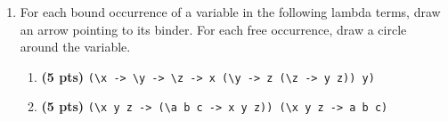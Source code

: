 \documentclass[paper=letter, fontsize=13pt]{article} %
\numberwithin{equation}{section} %
\newif\ifshowanswers\showanswerstrue
\begin{document}
\begin{enumerate}
\begin{verbatim}
let POW = ______(D)_______
\end{verbatim}
\begin{enumerate}[label=(\Alph*)]
   \item 
     \ifshowanswers 
      (5pts) \verb|(ISZ n)|  (parens optional).  Minor deduction (.5) for more complicated but correct answer.  Full credit if it is just the negation (i.e., using NOT)
     \else
           \bigskip
           \bigskip
           \bigskip
           \bigskip
     \fi
   \item
     \ifshowanswers 
       (5pts) \verb|ONE|  or \verb|n| 
     \else
           \bigskip
           \bigskip
           \bigskip
           \bigskip
     \fi
   \item
     \ifshowanswers 
      (5pts) \verb|MULT n (f (DECR x))|.  Full credit  requires correct operation (MULT), correct use of recursive call (f), and correct argument to f (DECR x), roughly equal weight.  Minor deduction (.5) for more complicated answer or other small errors.
     \else
           \bigskip
           \bigskip
           \bigskip
           \bigskip
     \fi
   \item 
     \ifshowanswers 
     (5pts) \verb|FIX POW1| . Half credit at least if FIX is applied to PROD1 in some way.
     \else
           \bigskip
           \bigskip
           \bigskip
           \bigskip
     \fi
\end{enumerate}

\newpage

\item For each bound occurrence of a variable in the following lambda terms, 
draw an arrow pointing to its binder. For each free occurrence, draw a circle around the variable.

\bigskip
\bigskip
\bigskip

\begin{enumerate}[label=(\Alph*)]
\item \textbf{(5 pts)} {\Large
  \verb|(\x -> \y -> \z -> x (\y -> z (\z -> y z)) y)|
}
\bigskip
\bigskip
\bigskip
\bigskip
\bigskip
\bigskip
\bigskip
\bigskip
\bigskip
\bigskip
\bigskip
\bigskip
\bigskip
\bigskip

\item \textbf{(5 pts)} {\Large
  \verb|(\x y z -> (\a b c -> x y z)) (\x y z -> a b c)|
}
\end{enumerate}

\bigskip
\bigskip
\bigskip


\end{enumerate}
\end{document}
